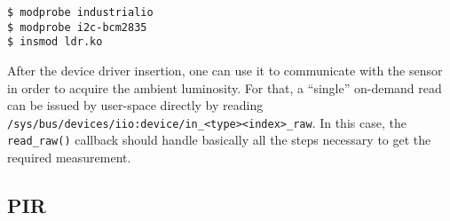 \begin{lstlisting}
$ modprobe industrialio
$ modprobe i2c-bcm2835
$ insmod ldr.ko
\end{lstlisting}

After the device driver insertion, one can use it to communicate with the sensor in order to acquire the ambient luminosity. For that, a “single” on-demand read can be issued by user-space directly by reading \linebreak \verb|/sys/bus/devices/iio:device/in_<type><index>_raw|. In this case, the \verb|read_raw()| callback should handle basically all the steps necessary to get the required measurement. \cite{read_tsl}
\subsection{PIR}